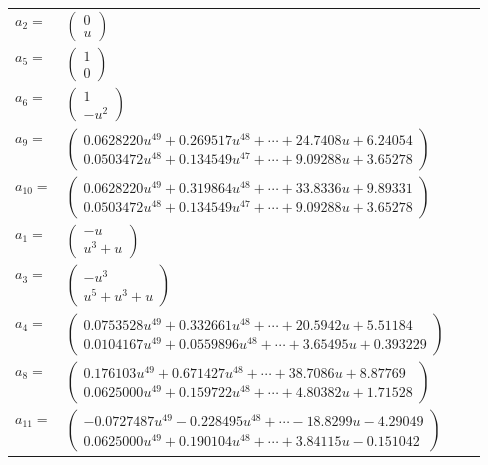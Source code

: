 \documentclass[1p]{elsarticle_modified}
\theoremstyle{definition}
\begin{document}
\begin{tabular}{m{7pt} m{180pt} m{7pt} m{180pt} }
\flushright $a_{2}=$&$\begin{pmatrix}0\\u\end{pmatrix}$ \\
\flushright $a_{5}=$&$\begin{pmatrix}1\\0\end{pmatrix}$ \\
\flushright $a_{6}=$&$\begin{pmatrix}1\\- u^2\end{pmatrix}$ \\
\flushright $a_{9}=$&$\begin{pmatrix}0.0628220 u^{49}+0.269517 u^{48}+\cdots+24.7408 u+6.24054\\0.0503472 u^{48}+0.134549 u^{47}+\cdots+9.09288 u+3.65278\end{pmatrix}$ \\
\flushright $a_{10}=$&$\begin{pmatrix}0.0628220 u^{49}+0.319864 u^{48}+\cdots+33.8336 u+9.89331\\0.0503472 u^{48}+0.134549 u^{47}+\cdots+9.09288 u+3.65278\end{pmatrix}$ \\
\flushright $a_{1}=$&$\begin{pmatrix}- u\\u^3+u\end{pmatrix}$ \\
\flushright $a_{3}=$&$\begin{pmatrix}- u^3\\u^5+u^3+u\end{pmatrix}$ \\
\flushright $a_{4}=$&$\begin{pmatrix}0.0753528 u^{49}+0.332661 u^{48}+\cdots+20.5942 u+5.51184\\0.0104167 u^{49}+0.0559896 u^{48}+\cdots+3.65495 u+0.393229\end{pmatrix}$ \\
\flushright $a_{8}=$&$\begin{pmatrix}0.176103 u^{49}+0.671427 u^{48}+\cdots+38.7086 u+8.87769\\0.0625000 u^{49}+0.159722 u^{48}+\cdots+4.80382 u+1.71528\end{pmatrix}$ \\
\flushright $a_{11}=$&$\begin{pmatrix}-0.0727487 u^{49}-0.228495 u^{48}+\cdots-18.8299 u-4.29049\\0.0625000 u^{49}+0.190104 u^{48}+\cdots+3.84115 u-0.151042\end{pmatrix}$ \\

\end{tabular}
\end{document}
